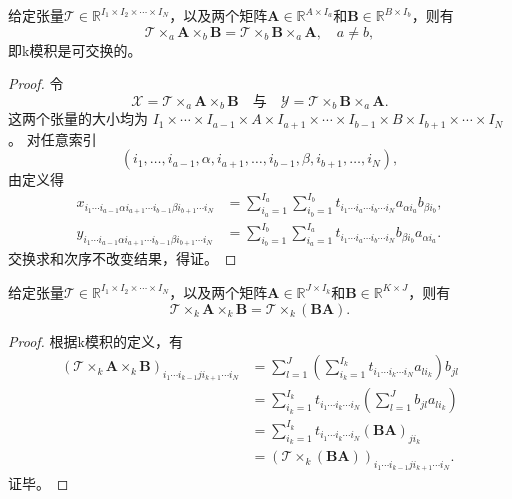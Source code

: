 \begin{property}
    给定张量\( \mathcal{T} \in \mathbb{R}^{I_1 \times I_2 \times \cdots \times I_N} \)，以及两个矩阵\( \mathbf{A} \in \mathbb{R}^{A \times I_a} \)和\( \mathbf{B} \in \mathbb{R}^{B \times I_b} \)，则有
    \[
        \mathcal{T} \times_a \mathbf{A} \times_b \mathbf{B} = \mathcal{T} \times_b \mathbf{B} \times_a \mathbf{A}, \quad a \neq b,
    \]
    即k模积是可交换的。
\end{property}
\begin{proof}
    令
    \[
        \mathcal{X} = \mathcal{T}\times_a \mathbf{A}\times_b \mathbf{B}
        \quad\text{与}\quad
        \mathcal{Y} = \mathcal{T}\times_b \mathbf{B}\times_a \mathbf{A}.
    \]
    这两个张量的大小均为
    $I_1\times\cdots\times I_{a-1}\times A\times I_{a+1}\times\cdots\times
        I_{b-1}\times B\times I_{b+1}\times\cdots\times I_N$。
    对任意索引
    \[
        (i_1,\ldots,i_{a-1},\alpha, i_{a+1},\ldots,i_{b-1},\beta, i_{b+1},\ldots,i_N),
    \]
    由定义得
    \begin{align*}
        x_{i_1\cdots i_{a-1}\alpha i_{a+1}\cdots i_{b-1}\beta i_{b+1}\cdots i_N}
         & = \sum_{i_a=1}^{I_a}\sum_{i_b=1}^{I_b}
        t_{i_1\cdots i_a\cdots i_b\cdots i_N}
        a_{\alpha i_a}b_{\beta i_b},              \\
        y_{i_1\cdots i_{a-1}\alpha i_{a+1}\cdots i_{b-1}\beta i_{b+1}\cdots i_N}
         & = \sum_{i_b=1}^{I_b}\sum_{i_a=1}^{I_a}
        t_{i_1\cdots i_a\cdots i_b\cdots i_N}
        b_{\beta i_b}a_{\alpha i_a}.
    \end{align*}
    交换求和次序不改变结果，得证。
\end{proof}

\begin{property}
    给定张量\( \mathcal{T} \in \mathbb{R}^{I_1 \times I_2 \times \cdots \times I_N} \)，以及两个矩阵\( \mathbf{A} \in \mathbb{R}^{J \times I_k} \)和\( \mathbf{B} \in \mathbb{R}^{K \times J} \)，则有
    \[
        \mathcal{T} \times_k \mathbf{A} \times_k \mathbf{B} = \mathcal{T} \times_k (\mathbf{B} \mathbf{A}).
    \]
\end{property}
\begin{proof}
    根据k模积的定义，有
    \begin{align*}
        \left(\mathcal{T}\times_k \mathbf{A}\times_k \mathbf{B}\right)_{i_1\cdots i_{k-1}j i_{k+1}\cdots i_N}
         & =\sum_{l=1}^{J}\left(\sum_{i_k=1}^{I_k}
        t_{i_1\cdots i_k\cdots i_N} a_{l i_k}\right)b_{jl}                                                    \\
         & =\sum_{i_k=1}^{I_k}t_{i_1\cdots i_k\cdots i_N}
        \left(\sum_{l=1}^{J}b_{jl}a_{l i_k}\right)                                                            \\
         & =\sum_{i_k=1}^{I_k}t_{i_1\cdots i_k\cdots i_N}(\mathbf{B} \mathbf{A})_{j i_k}                      \\
         & = \left(\mathcal{T}\times_k (\mathbf{B}\mathbf{A})\right)_{i_1\cdots i_{k-1} j i_{k+1}\cdots i_N}.
    \end{align*}
    证毕。
\end{proof}

